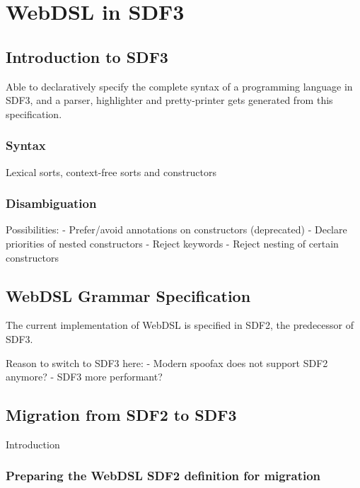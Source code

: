 
\chapter{\label{chap:sdf3}WebDSL in SDF3}

  \section{Introduction to SDF3}

    Able to declaratively specify the complete syntax of a programming language in SDF3, and a parser, highlighter and pretty-printer gets generated from this specification.

    \subsection{Syntax}

      Lexical sorts, context-free sorts and constructors

    \subsection{Disambiguation}

      Possibilities:
      - Prefer/avoid annotations on constructors (deprecated)
      - Declare priorities of nested constructors
      - Reject keywords
      - Reject nesting of certain constructors
  
  \section{WebDSL Grammar Specification}

    The current implementation of WebDSL is specified in SDF2, the predecessor of SDF3. 

    Reason to switch to SDF3 here:
    - Modern spoofax does not support SDF2 anymore?
    - SDF3 more performant?

  \section{Migration from SDF2 to SDF3}

    Introduction

    \subsection{Preparing the WebDSL SDF2 definition for migration}

